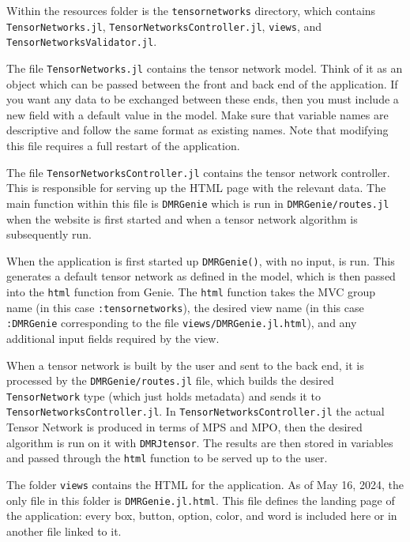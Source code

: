 \documentclass{article}
\begin{document}
\begin{multicols}{2}
Within the resources folder is the \lstinline|tensornetworks| directory, which contains \lstinline|TensorNetworks.jl|, \lstinline|TensorNetworksController.jl|, \lstinline|views|, and \lstinline|TensorNetworksValidator.jl|.

The file \lstinline|TensorNetworks.jl| contains the tensor network model. Think of it as an object which can be passed between the front and back end of the application. If you want any data to be exchanged between these ends, then you must include a new field with a default value in the model. Make sure that variable names are descriptive and follow the same format as existing names. Note that modifying this file requires a full restart of the application.

The file \lstinline|TensorNetworksController.jl| contains the tensor network controller. This is responsible for serving up the HTML page with the relevant data. The main function within this file is \lstinline|DMRGenie| which is run in \lstinline|DMRGenie/routes.jl| when the website is first started and when a tensor network algorithm is subsequently run.

When the application is first started up \lstinline|DMRGenie()|, with no input, is run. This generates a default tensor network as defined in the model, which is then passed into the \lstinline|html| function from Genie. The \lstinline|html| function takes the MVC group name (in this case \lstinline|:tensornetworks|), the desired view name (in this case \lstinline|:DMRGenie| corresponding to the file \lstinline|views/DMRGenie.jl.html|), and any additional input fields required by the view.

When a tensor network is built by the user and sent to the back end, it is processed by the \lstinline|DMRGenie/routes.jl| file, which builds the desired \lstinline|TensorNetwork| type (which just holds metadata) and sends it to \lstinline|TensorNetworksController.jl|. In \lstinline|TensorNetworksController.jl| the actual Tensor Network is produced in terms of MPS and MPO, then the desired algorithm is run on it with \lstinline|DMRJtensor|. The results are then stored in variables and passed through the \lstinline|html| function to be served up to the user.

The folder \lstinline|views| contains the HTML for the application. As of May 16, 2024, the only file in this folder is \lstinline|DMRGenie.jl.html|. This file defines the landing page of the application: every box, button, option, color, and word is included here or in another file linked to it.


\end{multicols}
\end{document}
